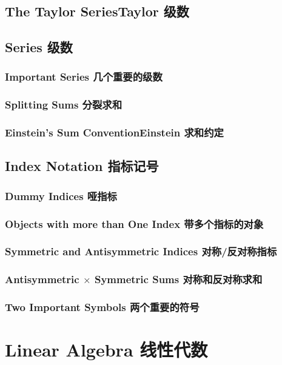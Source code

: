 \section[Taylor 级数]{The Taylor Series\quad Taylor 级数}

\section[级数]{Series 级数}
\subsection[几个重要的级数]{Important Series 几个重要的级数}
\subsection[分裂求和]{Splitting Sums 分裂求和}
\subsection[Einstein 求和约定]{Einstein’s Sum Convention\quad Einstein 求和约定}

\section[指标记号]{Index Notation 指标记号}
\subsection[哑指标]{Dummy Indices 哑指标}
\subsection[带多个指标的对象]{Objects with more than One Index 带多个指标的对象}
\subsection[对称/反对称指标]{Symmetric and Antisymmetric Indices 对称/反对称指标}
\subsection[对称和反对称求和]{Antisymmetric $\times$ Symmetric Sums 对称和反对称求和}
\subsection[两个重要的符号]{Two Important Symbols 两个重要的符号}

\chapter[线性代数]{Linear Algebra 线性代数}
